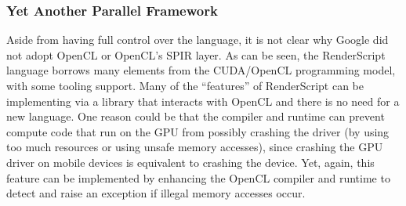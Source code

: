 \subsubsection{Yet Another Parallel Framework}

Aside from having full control over the language, it is not clear why
 Google did not adopt OpenCL or OpenCL's SPIR layer.
As can be seen, the RenderScript language borrows many elements from the CUDA/OpenCL 
 programming model, with some tooling support.
Many of the ``features'' of RenderScript can be implementing via a library that 
 interacts with OpenCL and there is no need for a new language.
One reason could be that the compiler and runtime can prevent compute code that run on the GPU from
 possibly crashing the driver (by using too much resources or using unsafe memory accesses),
 since crashing the GPU driver on mobile devices is equivalent to crashing the device.
Yet, again, this feature can be implemented by enhancing the OpenCL compiler and runtime to detect
 and raise an exception if illegal memory accesses occur.

